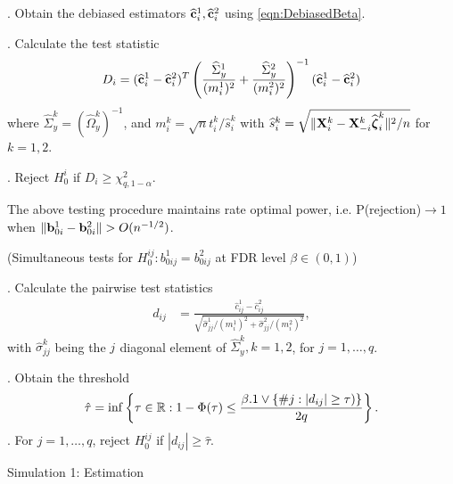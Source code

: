 \documentclass[landscape,a0paper,fontscale=0.4]{baposter} %
\DeclareMathOperator*{\Th}{^{\text{th}}}
\begin{document}
\begin{poster}
{\begin{Algorithm}
. Obtain the debiased estimators $\widehat {{\bf{c}}}_i^1, \widehat {{\bf{c}}}_i^2$ using \eqref{eqn:DebiasedBeta}.

. Calculate the test statistic
%
\vspace{-.5em}
$$
D_i = (\widehat {{\bf{c}}}_i^1 - \widehat {{\bf{c}}}_i^2)^T
\left( \frac{ \widehat \Sigma_y^1}{(m_i^1)^2} +
\frac{\widehat \Sigma_y^2}{(m_i^2)^2} \right)^{-1} (\widehat {{\bf{c}}}_i^1 - \widehat {{\bf{c}}}_i^2)
$$
%
where $\widehat \Sigma_y^k = (\widehat \Omega_y^k)^{-1}$, and $m_i^k = \sqrt n t_i^k / \widehat s_i^k$ with $\widehat s_i^k = \sqrt{\| {\mathbf{X}}_i^k - {\mathbf{X}}_{-i}^k \widehat {{\boldsymbol{\zeta}}}_i^k \|^2/n}$ for $k = 1,2$.

. Reject $H_0^i$ if $D_i \geq \chi^2_{q, 1-\alpha}$.
\end{Algorithm}

The above testing procedure maintains rate optimal power, i.e. P(rejection)$\rightarrow 1$ when $\| {\bf{b}}^1_{0i} - {\bf{b}}^2_{0i} \| > O( n^{-1/2})$.

\begin{Algorithm}\label{algo:AlgoFDR}
({\colbbf Simultaneous tests} for $H_0^{ij}: b_{0 ij}^1 = b_{0 ij}^2$ at FDR level $\beta \in (0,1)$)

. Calculate the pairwise test statistics
%
\vspace{-.5em}
\begin{align*}
d_{ij} &= \frac{\widehat c_{ij}^1 - \widehat c_{ij}^2}{\sqrt{\hat \sigma_{jj}^1/ (m_i^1)^2 + \hat \sigma_{jj}^2/ (m_i^2)^2}},
\end{align*}
%
with $\hat \sigma_{jj}^k$ being the $j^{\Th}$ diagonal element of $\widehat \Sigma_y^k, k = 1,2$, for $j = 1, \ldots, q$.

. Obtain the threshold
%
\vspace{-.5em}
$$
\hat \tau = \inf \left\{\tau \in {\mathbb{R}}: 1 - \Phi(\tau) \leq
\frac{\beta. 1 \vee \{ \#j: |d_{ij}| \geq \tau) \} }{2 q}
\right\}.
$$
%
. For $j = 1, \ldots, q$, reject $H_0^{ij}$ if $|d_{ij}| \geq \hat \tau$.
\end{Algorithm}

}


{
{\large\colbbf Simulation 1: Estimation}

}
\end{poster}
\end{document}
